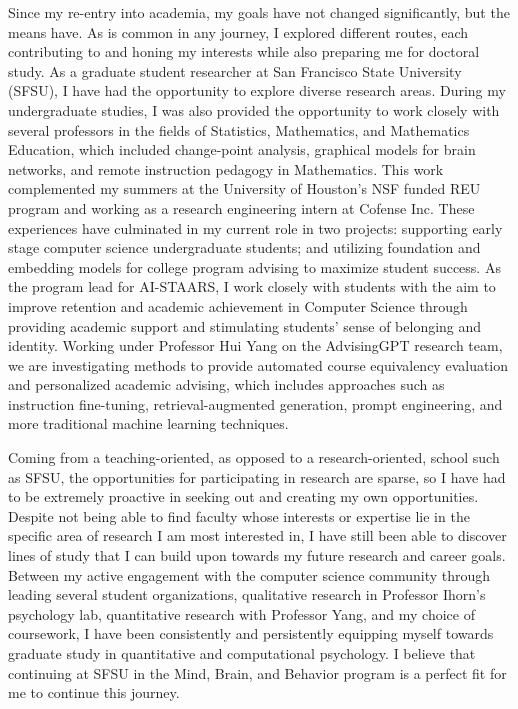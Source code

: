 \documentclass[12pt]{article}
\begin{document}
Since my re-entry into academia, my goals have not changed significantly, but the means have. As is common in any journey, I explored
different routes, each contributing to and honing my interests while also preparing me for doctoral study.  As a graduate student researcher
at San Francisco State University (SFSU), I have had the opportunity to explore diverse research areas. During my undergraduate studies, I
was also provided the opportunity to work closely with several professors in the fields of Statistics, Mathematics, and Mathematics
Education, which included change-point analysis, graphical models for brain networks, and remote instruction pedagogy in Mathematics.  This
work complemented my summers at the University of Houston's NSF funded REU program and working as a research engineering intern at Cofense
Inc.  These experiences have culminated in my current role in two projects: supporting early stage computer science undergraduate students;
and utilizing foundation and embedding models for college program advising to maximize student success.  As the program lead
for AI-STAARS, I work closely with students with the aim to improve retention and academic achievement in Computer Science through
providing academic support and stimulating students' sense of belonging and identity.  Working under Professor Hui Yang on the
AdvisingGPT research team, we are investigating methods to provide automated course equivalency evaluation and personalized academic
advising, which includes approaches such as instruction fine-tuning, retrieval-augmented generation, prompt engineering, and more
traditional machine learning techniques.

Coming from a teaching-oriented, as opposed to a research-oriented, school such as SFSU, the opportunities for participating in research are
sparse, so I have had to be extremely proactive in seeking out and creating my own opportunities.  Despite not being able to find faculty
whose interests or expertise lie in the specific area of research I am most interested in, I have still been able to discover lines of study
that I can build upon towards my future research and career goals.  Between my active engagement with the computer science community through
leading several student organizations, qualitative research in Professor Ihorn's psychology lab, quantitative research with Professor Yang,
and my choice of coursework, I have been consistently and persistently equipping myself towards graduate study in quantitative and
computational psychology.  I believe that continuing at SFSU in the Mind, Brain, and Behavior program is a perfect fit for me to continue
this journey.
\end{document}
